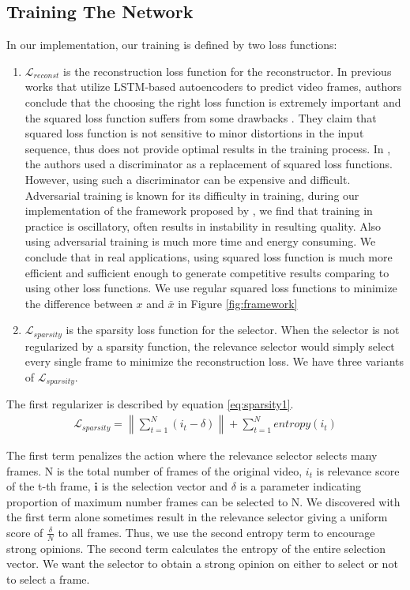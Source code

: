 \documentclass[5pt]{article}
\newcommand{\norm}[1]{\left\lVert#1\right\rVert}
\begin{document}
\subsection{Training The Network}
In our implementation, our training is defined by two loss functions: 
\begin{enumerate}
\item $\mathcal{L}_{reconst}$ is the reconstruction loss function for the reconstructor. In previous works that utilize LSTM-based autoencoders to predict video frames, authors conclude that the choosing the right loss function is extremely important and the squared loss function suffers from some drawbacks \cite{ranzato2014video}. They claim that squared loss function is not sensitive to minor distortions in the input sequence, thus does not provide optimal results in the training process. In  \cite{mahasseni2017unsupervised}, the authors used a discriminator as a replacement of squared loss functions. However, using such a discriminator can be expensive and difficult. Adversarial training is known for its difficulty in training, during our implementation of the framework proposed by \cite{mahasseni2017unsupervised}, we find that training in practice is oscillatory, often results in instability in resulting quality. Also using adversarial training is much more time and energy consuming. We conclude that in real applications, using squared loss function is much more efficient and sufficient enough to generate competitive results comparing to using other loss functions. We use regular squared loss functions to minimize the difference between $x$ and $\bar{x}$ in Figure \ref{fig:framework}

\item $\mathcal{L}_{sparsity}$ is the sparsity loss function for the selector. When the selector is not regularized by a sparsity function, the relevance selector would simply select every single frame to minimize the reconstruction loss. We have three variants of $\mathcal{L}_{sparsity}$. 
\end{enumerate}
The first regularizer is described by equation \ref{eq:sparsity1}. 
\begin{eqnarray}
\mathcal{L}_{sparsity} = \norm{\sum_{t=1}^N (i_t-\delta) } + \sum_{t=1}^N  entropy(i_t)
\label{eq:sparsity1}
\end{eqnarray}

The first term penalizes the action where the relevance selector selects many frames. N is the total number of frames of the original video, $i_t$ is relevance score of the t-th frame, $\mathbf{i}$ is the selection vector and $\delta$ is a parameter indicating proportion of maximum number frames can be selected to N. We discovered with the first term alone sometimes result in the relevance selector giving a uniform score of $\frac{\delta}{N}$ to all frames. Thus, we use the second entropy term to encourage strong opinions. The second term calculates the entropy of the entire selection vector. We want the selector to obtain a strong opinion on either to select or not to select a frame.
\end{document}
